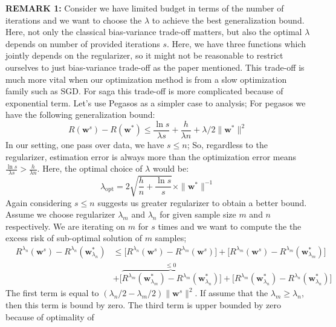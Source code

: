 \documentclass[11pt, a4paper, reqno, twoside]{scrartcl}
\theoremstyle{style}
\newcommand{\wv}{\bm{w}}
\newcommand{\0}{\mathbf{0}} %
\begin{document}
\textbf{REMARK 1:}
Consider we have limited budget in terms of the number of iterations and we
want to choose the $\lambda$ to achieve the best generalization bound.
Here, not only the classical bias-variance trade-off matters, but also the
optimal $\lambda$ depends on number of provided iterations $s$. 
Here, we have three functions which jointly depends on the regularizer, so it
might not be reasonable to restrict ourselves to just bias-variance trade-off as
the paper \cite{shalev2008svm} mentioned. This trade-off is much more vital when
our optimization method is from a slow optimization family such as SGD. For saga
this trade-off is more complicated because of exponential term. Let's use
Pegasos \cite{shalev2011pegasos} as a simpler case to analysis; For pegasos we
have the following generalization bound: 
\begin{equation*}
	R(\wv^s) - R(\wv^*) \leq \frac{\ln s}{\lambda s} + \frac{h}{\lambda n} +
	\lambda/2 \|\wv^*\|^2
\end{equation*}
In our setting, one pass over data, we have $s\leq n$; So, regardless to the
regularizer, estimation error is always more than the optimization error means
$\frac{\ln s}{\lambda s} >  \frac{h}{\lambda n}$.
Here, the optimal choice of $\lambda$ would be: 
\begin{equation*}
	\lambda_{\text{opt}} = 2 \sqrt{\frac{h}{n}+\frac{\ln s}{s}} \times
	\|\wv^*\|^{-1}
\end{equation*}
Again considering $s \leq n$ suggests us greater regularizer to obtain a better
bound. \\
Assume we choose regularizer $\lambda_m$ and $\lambda_n$ for given sample
size $m$ and $n$ respectively. We are iterating on $m$ for $s$ times and we
want to compute the the excess risk of sub-optimal solution of $m$ samples;
\begin{eqnarray*}
	& R^{\lambda_n}(\wv^s) - R^{\lambda_n}(\wv^*_{\lambda_n}) & \leq
	\bigg[R^{\lambda_n}(\wv^s) - R^{\lambda_m}(\wv^s)\bigg] + \bigg[
	R^{\lambda_m}(\wv^s) -R^{\lambda_m}(\wv_{\lambda_m}^*) \bigg] \\ 
	& & + \bigg[ \overbrace{R^{\lambda_m}(\wv_{\lambda_m}^*) -
	R^{\lambda_m}(\wv_{\lambda_n}^*)}^{\leq 0} \bigg] + \bigg[
	R^{\lambda_m}(\wv^*_{\lambda_n}) - R^{\lambda_n}(\wv^*_{\lambda_n}) \bigg]
\end{eqnarray*}
The first term is equal to $(\lambda_n/2 - \lambda_m/2) \|\wv^s\|^2$. If
assume that the $\lambda_m \geq \lambda_n$, then this term is bound by zero. 
The third term is upper bounded by zero because of optimality of
\end{document}
